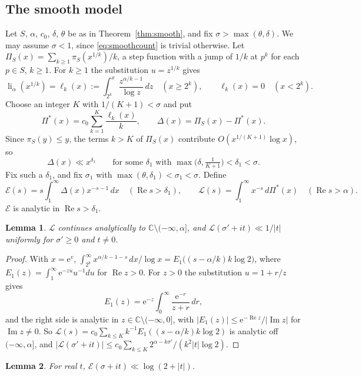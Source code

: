 \documentclass[11pt]{amsart}
\newtheorem{lemma}{Lemma}[section]
\theoremstyle{remark}
\numberwithin{equation}{section}
\newcommand{\C}{\mathbb{C}}
\newcommand{\cL}{\mathcal{L}}
\newcommand{\cE}{\mathcal{E}}
\newcommand{\e}{\mathrm{e}}
\DeclareMathOperator{\re}{Re}
\DeclareMathOperator{\im}{Im}
\DeclareMathOperator{\li}{li}
\begin{document}
\subsection{The smooth model}
Let $S$, $\alpha$, $c_0$, $\delta$, $\theta$ be as in Theorem~\ref{thm:smooth}, and fix $\sigma>\max(\theta,\delta)$. We may assume $\sigma<1$, since \eqref{eq:smoothcount} is trivial otherwise. Let $\Pi_S(x)=\sum_{k\ge1}\pi_S(x^{1/k})/k$, a step function with a jump of $1/k$ at $p^k$ for each $p\in S$, $k\ge1$. For $k\ge1$ the substitution $u=z^{1/k}$ gives
\[
\li_\alpha(x^{1/k})=\ell_k(x):=\int_{2^k}^x\frac{z^{\alpha/k-1}}{\log z}\,dz\quad(x\ge2^k),\qquad \ell_k(x)=0\quad(x<2^k).
\]
Choose an integer $K$ with $1/(K+1)<\sigma$ and put
\[
\Pi^*(x)=c_0\sum_{k=1}^K\frac{\ell_k(x)}{k},\qquad \Delta(x)=\Pi_S(x)-\Pi^*(x).
\]
Since $\pi_S(y)\le y$, the terms $k>K$ of $\Pi_S(x)$ contribute $O(x^{1/(K+1)}\log x)$, so
\begin{equation}\label{eq:Delta}
\Delta(x)\ll x^{\delta_1}\qquad\text{for some }\delta_1\text{ with }\max\bigl(\delta,\tfrac{1}{K+1}\bigr)<\delta_1<\sigma .
\end{equation}
Fix such a $\delta_1$, and fix $\sigma_1$ with $\max(\theta,\delta_1)<\sigma_1<\sigma$. Define
\[
\cE(s)=s\int_1^\infty\Delta(x)x^{-s-1}\,dx\quad(\re s>\delta_1),\qquad \cL(s)=\int_1^\infty x^{-s}\,d\Pi^*(x)\quad(\re s>\alpha).
\]
$\cE$ is analytic in $\re s>\delta_1$.

\begin{lemma}\label{lem:E1}
$\cL$ continues analytically to $\C\setminus(-\infty,\alpha]$, and $\cL(\sigma'+it)\ll 1/|t|$ uniformly for $\sigma'\ge0$ and $t\ne0$.
\end{lemma}

\begin{proof}
With $x=\e^v$, $\int_{2^k}^\infty x^{\alpha/k-1-s}\,dx/\log x=E_1\bigl((s-\alpha/k)k\log2\bigr)$, where $E_1(z)=\int_1^\infty \e^{-zu}u^{-1}du$ for $\re z>0$. For $z>0$ the substitution $u=1+r/z$ gives
\[
E_1(z)=\e^{-z}\int_0^\infty\frac{\e^{-r}}{z+r}\,dr ,
\]
and the right side is analytic in $z\in\C\setminus(-\infty,0]$, with $|E_1(z)|\le \e^{-\re z}/|\im z|$ for $\im z\ne0$. So $\cL(s)=c_0\sum_{k\le K}k^{-1}E_1((s-\alpha/k)k\log2)$ is analytic off $(-\infty,\alpha]$, and $|\cL(\sigma'+it)|\le c_0\sum_{k\le K}2^{\alpha-k\sigma'}/(k^2|t|\log2)$.
\end{proof}

\begin{lemma}\label{lem:pointwise}
For real $t$, $\cE(\sigma+it)\ll\log(2+|t|)$.
\end{lemma}
\end{document}

